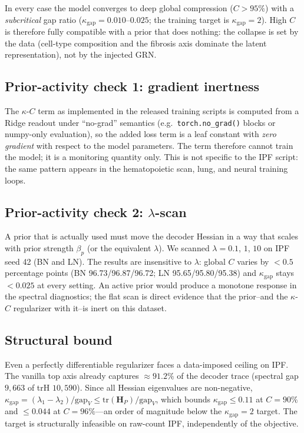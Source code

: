 \documentclass[11pt,a4paper]{article}
\begin{document}
In every case the model converges to deep global compression ($C>95\%$) with a \emph{subcritical} gap ratio ($\kappa_{\mathrm{gap}}=0.010$--$0.025$; the training target is $\kappa_{\mathrm{gap}}=2$). High $C$ is therefore fully compatible with a prior that does nothing: the collapse is set by the data (cell-type composition and the fibrosis axis dominate the latent representation), not by the injected GRN.

\subsection*{Prior-activity check 1: gradient inertness}

The $\kappa$-$C$ term as implemented in the released training scripts is computed from a Ridge readout under ``no-grad'' semantics (e.g.\ \texttt{torch.no\_grad()} blocks or numpy-only evaluation), so the added loss term is a leaf constant with \emph{zero gradient} with respect to the model parameters. The term therefore cannot train the model; it is a monitoring quantity only. This is not specific to the IPF script: the same pattern appears in the hematopoietic scan, lung, and neural training loops.

\subsection*{Prior-activity check 2: $\lambda$-scan}

A prior that is actually used must move the decoder Hessian in a way that scales with prior strength $\beta_p$ (or the equivalent $\lambda$). We scanned $\lambda=0.1$, $1$, $10$ on IPF seed 42 (BN and LN). The results are insensitive to $\lambda$: global $C$ varies by $<0.5$ percentage points (BN 96.73/96.87/96.72; LN 95.65/95.80/95.38) and $\kappa_{\mathrm{gap}}$ stays $<0.025$ at every setting. An active prior would produce a monotone response in the spectral diagnostics; the flat scan is direct evidence that the prior--and the $\kappa$-$C$ regularizer with it--is inert on this dataset.

\subsection*{Structural bound}

Even a perfectly differentiable regularizer faces a data-imposed ceiling on IPF. The vanilla top axis already captures $\approx 91.2\%$ of the decoder trace (spectral gap $9{,}663$ of trH $10{,}590$). Since all Hessian eigenvalues are non-negative, $\kappa_{\mathrm{gap}} = (\lambda_1-\lambda_2)/\mathrm{gap}_V \leq \mathrm{tr}(\mathbf{H}_P)/\mathrm{gap}_V$, which bounds $\kappa_{\mathrm{gap}} \leq 0.11$ at $C=90\%$ and $\leq 0.044$ at $C=96\%$---an order of magnitude below the $\kappa_{\mathrm{gap}}=2$ target. The target is structurally infeasible on raw-count IPF, independently of the objective.
\end{document}
